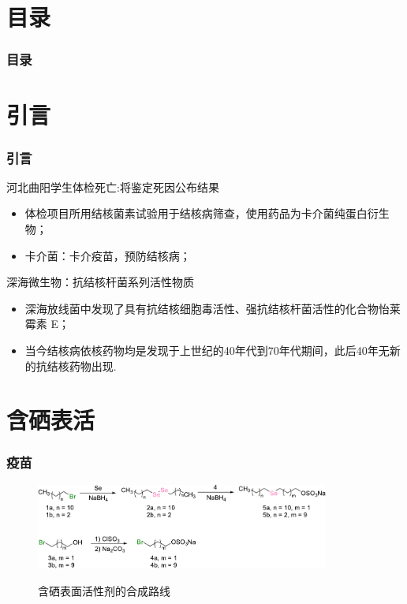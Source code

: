 \documentclass[10pt,aspectratio=43,mathserif]{beamer}
\title[含硒表面活性剂囊泡的构筑与性质研究]{\fontsize{13pt}{18pt}\selectfont {含硒表面活性剂囊泡的构筑与性质研究}}
\subtitle{\fontsize{9pt}{14pt}\selectfont \textbf{毕业论文答辩}}
\author[应用化学1502班]{
    陈育明  \\\medskip
    {\small {应用化学1502班}}
}
\institute[SCME]{
  化学与材料工程学院\\
  江南大学}
\date[2019年6月8日]{
 2019年6月8日}
\begin{document}
\begin{frame}
\titlepage
\end{frame}				%



\section*{目录}

		\begin{frame}
		\frametitle{\textbf{目录}}
		\textbf{\tableofcontents}
		\end{frame}				%

\section{引言}

    \begin{frame}
    \frametitle{引言}
    \begin{block}{河北曲阳学生体检死亡:将鉴定死因公布结果}
        \begin{itemize}
        \item 体检项目所用结核菌素试验用于结核病筛查，使用药品为卡介菌纯蛋白衍生物；
        \item 卡介菌：卡介疫苗，预防结核病；
        \end{itemize}
    \end{block}
    \begin{block}{深海微生物：抗结核杆菌系列活性物质\footnotemark[1]}
        \begin{itemize}
        \item 深海放线菌中发现了具有抗结核细胞毒活性、强抗结核杆菌活性的化合物怡莱霉素 E；
        \item 当今结核病依核药物均是发现于上世纪的40年代到70年代期间，此后40年无新的抗结核药物出现. 
        \end{itemize}
    \end{block}
    \end{frame}

\section[制备]{含硒表活}

 \begin{frame}
\frametitle{\textbf{疫苗}}
    \begin{figure}[htbp]
    \centering
    \includegraphics[width=0.86\textwidth]{figure/synthesis3.pdf}\\
    \caption{含硒表面活性剂的合成路线}\label{fig:synthesis}
\end{figure}
\end{frame}
\end{document}
